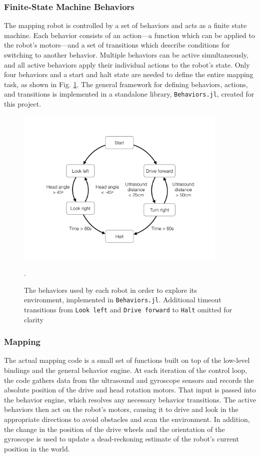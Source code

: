\documentclass[]{article}
\begin{document}
\subsubsection{Finite-State Machine Behaviors}

The mapping robot is controlled by a set of behaviors and acts as a finite state machine. Each behavior consists of an action---a function which can be applied to the robot's motors---and a set of transitions which describe conditions for switching to another behavior. Multiple behaviors can be active simultaneously, and all active behaviors apply their individual actions to the robot's state. Only four behaviors and a start and halt state are needed to define the entire mapping task, as shown in Fig. \ref{fig:mapping_behaviors}. The general framework for defining behaviors, actions, and transitions is implemented in a standalone library, \texttt{Behaviors.jl}, created for this project. 

\begin{figure}[htbp]
    \centering
    \includegraphics[width=0.9\textwidth, clip=true, trim=1in 1in 1in 1in]{fig/behaviors.pdf}
    \caption{The behaviors used by each robot in order to explore its environment, implemented in \texttt{Behaviors.jl}. Additional timeout transitions from \texttt{Look left} and \texttt{Drive forward} to \texttt{Halt} omitted for clarity}. 
    \label{fig:mapping_behaviors}
\end{figure}

\subsubsection{Mapping}

The actual mapping code is a small set of functions built on top of the low-level bindings and the general behavior engine. At each iteration of the control loop, the code gathers data from the ultrasound and gyroscope sensors and records the absolute position of the drive and head rotation motors. That input is passed into the behavior engine, which resolves any necessary behavior transitions. The active behaviors then act on the robot's motors, causing it to drive and look in the appropriate directions to avoid obstacles and scan the environment. In addition, the change in the position of the drive wheels and the orientation of the gyroscope is used to update a dead-reckoning estimate of the robot's current position in the world. 
\end{document}
